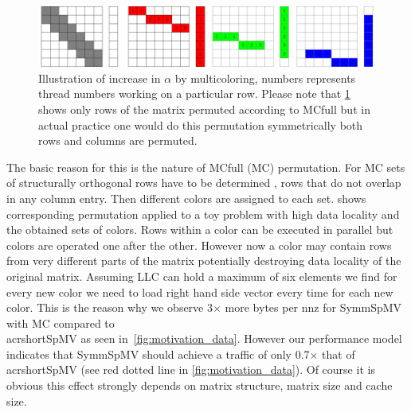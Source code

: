   \begin{figure}[htbp]
  	\centering
  	\includegraphics[scale=0.45]{pics/mc_alpha_problem/mc_alpha_unsymm}
  	\caption{Illustration of increase in $\alpha$ by multicoloring, numbers represents thread numbers working on a particular row. Please note that \cref{fig:mc_alpha} shows only rows of the matrix permuted according to \acrshort{MC}full but in actual practice one would do this permutation symmetrically \ie both rows and columns are permuted.}
  	\label{fig:mc_alpha}
  \end{figure}
  
  The basic reason for this is the nature of \acrshort{MC}full (\acrshort{MC}) permutation. For \DTWO \acrshort{MC} sets of structurally orthogonal rows have to be determined \cite{dist_k_def}, \ie rows that do not overlap in any column entry. Then different colors are assigned to each set.  shows corresponding permutation applied to a toy problem with high data locality and the obtained sets of colors. Rows within a color can be executed in parallel but colors are operated one after the other. However now a color may contain rows from very different parts of the matrix potentially destroying data locality of the original matrix.  Assuming \acrfull{LLC} can hold a maximum of six elements we find for every new color we need to load right hand side vector every time for each new color. This is the reason why we observe 3$\times$ more bytes per \acrshort{nnz} for \acrshort{SymmSpMV} with \acrshort{MC} compared to \\acrshort{SpMV} as seen in~\cref{fig:motivation_data}.  However our performance model indicates that \acrshort{SymmSpMV} should achieve a traffic of only 0.7$\times$ that of \\acrshort{SpMV} (see red dotted line in \cref{fig:motivation_data}). Of course it is obvious this effect strongly depends on matrix structure, matrix size and cache size. 
      
